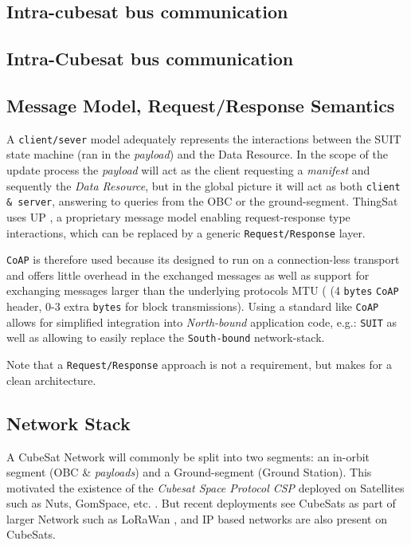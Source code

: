 \subsection{Intra-cubesat bus communication}

\subsection{Intra-Cubesat bus communication}

\subsection{Message Model, Request/Response Semantics}

A \texttt{client/sever} model adequately represents the interactions between the SUIT state
machine (ran in the \textit{payload}) and the Data Resource. In the scope of the
update process the \textit{payload} will act as the client requesting a \textit{manifest}
and sequently the \textit{Data Resource}, but in the global picture it will act
as both \texttt{client \& server}, answering to queries from the OBC or the
ground-segment. ThingSat uses UP , a proprietary message
model enabling request-response type interactions, which can be replaced by a
generic \texttt{Request/Response} layer.

\texttt{CoAP} is therefore used because its designed to run on a connection-less transport
and offers little overhead in the exchanged messages as well as support for exchanging
messages larger than the underlying protocols MTU (
(4 \texttt{bytes} \texttt{CoAP} header, 0-3 extra \texttt{bytes} for block transmissions).
Using a standard like \texttt{CoAP} allows for simplified integration into \textit{North-bound}
application code, e.g.: \texttt{SUIT} as well as allowing to easily replace the
\texttt{South-bound} network-stack.

Note that a \texttt{Request/Response} approach is not a requirement, but makes
for a clean architecture.

\subsection{Network Stack}

A CubeSat Network will commonly be split into two segments: an in-orbit segment
(OBC \& \textit{payloads}) and a Ground-segment (Ground Station). This motivated
the existence of the \textit{Cubesat Space Protocol CSP} deployed on Satellites
such as Nuts, GomSpace, etc. . But recent deployments see CubeSats
as part of larger Network such as LoRaWan , and IP based
networks are also present on CubeSats.

